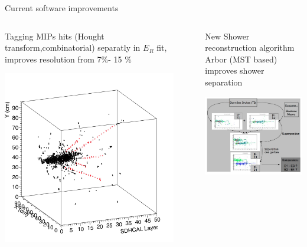 \documentclass[10pt]{beamer}
\begin{document}
\begin{frame}{Current software improvements}
\begin{columns}
\begin{column}{0.5\textwidth}
  {
    \par Tagging MIPs hits (Hought transform,combinatorial) separatly in $E_R$ fit, improves resolution from 7\%- 15 \%
  }

  \centerline{\includegraphics[width=0.9\textwidth]{jpg/Beam2012Hough.jpg}}
\end{column}
\begin{column}{0.5\textwidth}
  {
    \par New Shower reconstruction algorithm Arbor (MST based) improves shower separation
  }
  \centerline{\includegraphics[width=1.15\textwidth]{jpg/Beam2012Arbor.jpg}}
\end{column}
\end{columns}

\end{frame}
\end{document}
